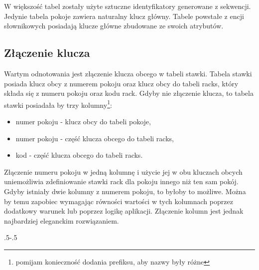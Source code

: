 \documentclass[a4paper,onecolumn,oneside,11pt,wide,floatssmall]{mwrep}
\theoremstyle{definition}
\theoremstyle{plain}%
\theoremstyle{remark}
\begin{document}
W większość tabel zostały użyte sztuczne identyfikatory generowane z sekwencji. Jedynie tabela pokoje zawiera naturalny klucz główny. Tabele powstałe z encji słownikowych posiadają klucze główne zbudowane ze swoich atrybutów.

\subsection{Złączenie klucza}
Wartym odnotowania jest złączenie klucza obcego w tabeli stawki. Tabela stawki posiada klucz obcy z numerem pokoju oraz klucz obcy do tabeli racks, który składa się z numeru pokoju oraz kodu rack. Gdyby nie złączenie klucza, to tabela stawki posiadała by trzy kolumny\footnote{pomijam konieczność dodania prefiksu, aby nazwy były różne}:
\begin{itemize}
  \item numer pokoju - klucz obcy do tabeli pokoje,
  \item numer pokoju - część klucza obcego do tabeli racks,
  \item kod - część klucza obcego do tabeli racks.
\end{itemize}

Złączenie numeru pokoju w jedną kolumnę i użycie jej w obu kluczach obcych uniemożliwia zdefiniowanie stawki rack dla pokoju innego niż ten sam pokój. Gdyby istniały dwie kolumny z numerem pokoju, to byłoby to możliwe. Można by temu zapobiec wymagając równości wartości w tych kolumnach poprzez dodatkowy warunek lub poprzez logikę aplikacji. Złączenie kolumn jest jednak najbardziej eleganckim rozwiązaniem.


  

\clearpage
 {\pdfpagewidth
    \vspace*{1cm}
    \noindent\kern.5\pdfpagewidth{}\kern-.5\pdfpagewidth
     \par
     \vspace*{-5cm}
\clearpage
}
\end{document}
